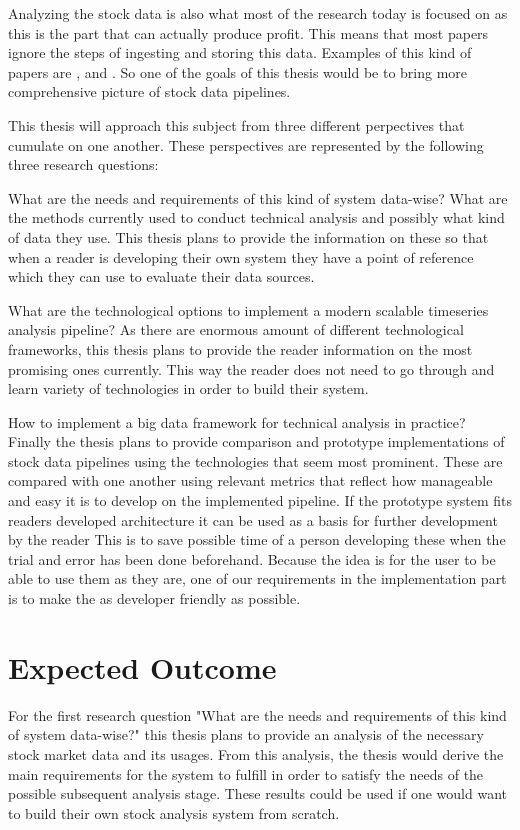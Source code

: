 Analyzing the stock data is also what most of the research today is focused on as this is the part that can actually produce profit.
This means that most papers ignore the steps of ingesting and storing this data.
Examples of this kind of papers are \cite{wu}, \cite{aghakhani} and \cite{kao}.
So one of the goals of this thesis would be to bring more comprehensive picture of stock data pipelines. 

This thesis will approach this subject from three different perpectives that cumulate on one another.
These perspectives are represented by the following three research questions:

What are the needs and requirements of this kind of system data-wise?
What are the methods currently used to conduct technical analysis and possibly what kind of data they use.
This thesis plans to provide the information on these so that when a reader is developing their own system they have a point of reference which they can use to evaluate their data sources.

What are the technological options to implement a modern scalable timeseries analysis pipeline?
As there are enormous amount of different technological frameworks, this thesis plans to provide the reader information on the most promising ones currently.
This way the reader does not need to go through and learn variety of technologies in order to build their system.

How to implement a big data framework for technical analysis in practice?
Finally the thesis plans to provide comparison and prototype implementations of stock data pipelines using the technologies that seem most prominent.
These are compared with one another using relevant metrics that reflect how manageable and easy it is to develop on the implemented pipeline.
If the prototype system fits readers developed architecture it can be used as a basis for further development by the reader
This is to save possible time of a person developing these when the trial and error has been done beforehand.
Because the idea is for the user to be able to use them as they are, one of our requirements in the implementation part is to make the as developer friendly as possible.

\section{Expected Outcome}

For the first research question "What are the needs and requirements of this kind of system data-wise?" this thesis plans to provide an analysis of the necessary stock market data and its usages.
From this analysis, the thesis would derive the main requirements for the system to fulfill in order to satisfy the needs of the possible subsequent analysis stage.
These results could be used if one would want to build their own stock analysis system from scratch.

